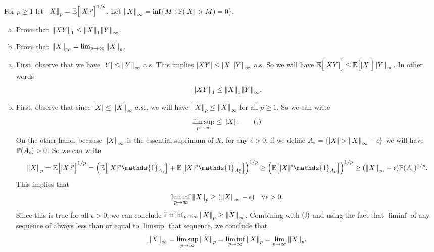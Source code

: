 \begin{problem}
	For $ p\geq 1 $ let $ \norm{X}_p = \mathbb{E}\big[|X|^p\big]^{1/p} $. Let $ \norm{X}_\infty = \inf\set{M: \prob(\abs{X}>M)=0}. $
	\begin{enumerate}[(a)]
		\item Prove that $ \norm{XY}_1 \leq \norm{X}_1 \norm{Y}_\infty $.
		\item Prove that $ \norm{X}_\infty = \lim_{p\to\infty} \norm{X}_p $.
	\end{enumerate}
\end{problem}
\begin{solution}
	\begin{enumerate}[(a)]
		\item First, observe that we have $ |Y|\leq \norm{Y}_\infty $ a.s. This implies $ |XY|\leq |X|\norm{Y}_\infty $ a.s. So we will have $ \mathbb{E}\big[|XY|\big]\leq \mathbb{E}\big[|X|\big]\norm{Y}_\infty $. In other words
		\[ \norm{XY}_1 \leq \norm{X}_1 \norm{Y}_\infty. \]
		\item First, observe that since $ |X|\leq \norm{X}_\infty\ a.s. $, we will have $ \norm{X}_p \leq \norm{X}_\infty $ for all $ p\geq 1 $. So we can write
		\[ \limsup_{p\to\infty} \leq \norm{X}. \tag{\halfnote} \]
		On the other hand, because $ \norm{X}_\infty $ is the essential suprimum of $ X $,  for any $ \epsilon > 0 $, if we define $ A_\epsilon = \set{\abs{X}>\norm{X}_\infty - \epsilon} $ we will have $ \mathbb{P}(A_\epsilon)>0 $. So we can write
		\[ \norm{X}_p = \E{\abs{X}^p}^{1/p} = \left( \E{\abs{X}^p \mathds{1}_{A_\epsilon}} + \E{\abs{X}^p \mathds{1}_{A_\epsilon^c}} \right)^{1/p} \geq \left( \E{\abs{X}^p \mathds{1}_{A_\epsilon}} \right)^{1/p} \geq (\norm{X}_\infty - \epsilon)\prob(A_\epsilon)^{1/p}. \]
		This implies that 
		\[ \liminf_{p\to\infty} \norm{X}_p \geq (\norm{X}_\infty - \epsilon) \quad \forall \epsilon>0. \]
		Since this is true for all $ \epsilon>0 $, we can conclude $ \liminf_{p\to\infty}\norm{X}_p \geq \norm{X}_\infty $. Combining with $ (\halfnote) $ and using the fact that $ \liminf $ of any sequence of always less than or equal to $ \limsup $ that sequence, we conclude that 
		\[ \norm{X}_\infty = \limsup_{p\to\infty} \norm{X}_p = \liminf_{p\to\infty}\norm{X}_p = \lim_{p\to\infty}\norm{X}_p. \]
	\end{enumerate}
\end{solution}

